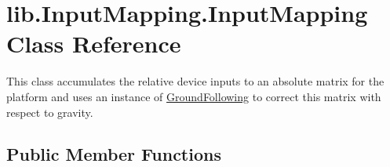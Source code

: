 \hypertarget{classlib_1_1InputMapping_1_1InputMapping}{\section{lib.\-Input\-Mapping.\-Input\-Mapping \-Class \-Reference}
\label{classlib_1_1InputMapping_1_1InputMapping}
}


\-This class accumulates the relative device inputs to an absolute matrix for the platform and uses an instance of \hyperlink{namespacelib_1_1GroundFollowing}{\-Ground\-Following} to correct this matrix with respect to gravity.  


\subsection*{\-Public \-Member \-Functions}
